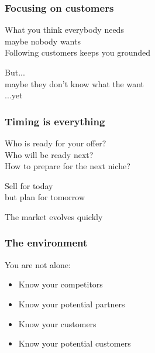 \documentclass[17pt,aspectratio=169,hyperref=pdfusetitle]{beamer}
\begin{document}
\begin{frame}[fragile]
  \frametitle{Focusing on customers}

  What you think everybody needs \\
  maybe nobody wants \\
  \vspace{.5cm}
  Following customers keeps you grounded \\

  \begin{flushright}
    But... \\
    maybe they don't know what the want \\
    ...yet \\
  \end{flushright}
\end{frame}

\begin{frame}[fragile]
  \frametitle{Timing is everything}

  Who is ready for your offer? \\
  Who will be ready next? \\
  How to prepare for the next niche? \\
  
  \begin{flushright}
    Sell for today \\
    but plan for tomorrow \\
  \end{flushright}

  The market evolves quickly
\end{frame}

\begin{frame}[fragile]
  \frametitle{The environment}

  You are not alone:

  \begin{itemize}
  \item Know your competitors
  \item Know your potential partners
  \item Know your customers
  \item Know your potential customers
  \end{itemize}

\end{frame}
\end{document}
